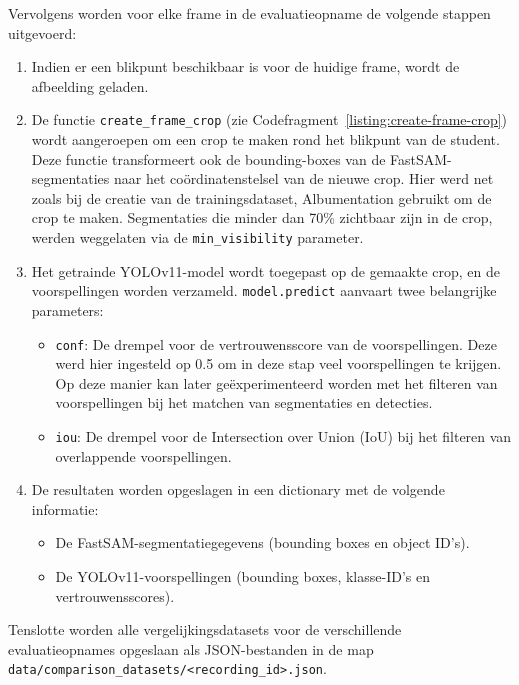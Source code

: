 Vervolgens worden voor elke frame in de evaluatieopname de volgende stappen uitgevoerd:
\begin{enumerate}
    \item Indien er een blikpunt beschikbaar is voor de huidige frame, wordt de afbeelding geladen.
    \item De functie \texttt{create\_frame\_crop} (zie Codefragment~\ref{listing:create-frame-crop}) wordt aangeroepen om een crop te maken rond het blikpunt van de student.
    Deze functie transformeert ook de bounding-boxes van de FastSAM-segmentaties naar het coördinatenstelsel van de nieuwe crop.
    Hier werd net zoals bij de creatie van de trainingsdataset, Albumentation gebruikt om de crop te maken.
    Segmentaties die minder dan 70\% zichtbaar zijn in de crop, werden weggelaten via de \texttt{min\_visibility} parameter.
    \item Het getrainde YOLOv11-model wordt toegepast op de gemaakte crop, en de voorspellingen worden verzameld.
    \texttt{model.predict} aanvaart twee belangrijke parameters:
    \begin{itemize}
        \item \texttt{conf}: De drempel voor de vertrouwensscore van de voorspellingen.
        Deze werd hier ingesteld op 0.5 om in deze stap veel voorspellingen te krijgen. 
        Op deze manier kan later geëxperimenteerd worden met het filteren van voorspellingen bij het matchen van segmentaties en detecties.
        \item \texttt{iou}: De drempel voor de Intersection over Union (IoU) bij het filteren van overlappende voorspellingen.
    \end{itemize}
    \item De resultaten worden opgeslagen in een dictionary met de volgende informatie:
    \begin{itemize}
        \item De FastSAM-segmentatiegegevens (bounding boxes en object ID's).
        \item De YOLOv11-voorspellingen (bounding boxes, klasse-ID's en vertrouwensscores).
    \end{itemize}
\end{enumerate}
Tenslotte worden alle vergelijkingsdatasets voor de verschillende evaluatieopnames opgeslaan als JSON-bestanden in de map 
\texttt{data/comparison\_datasets/<recording\_id>.json}.

